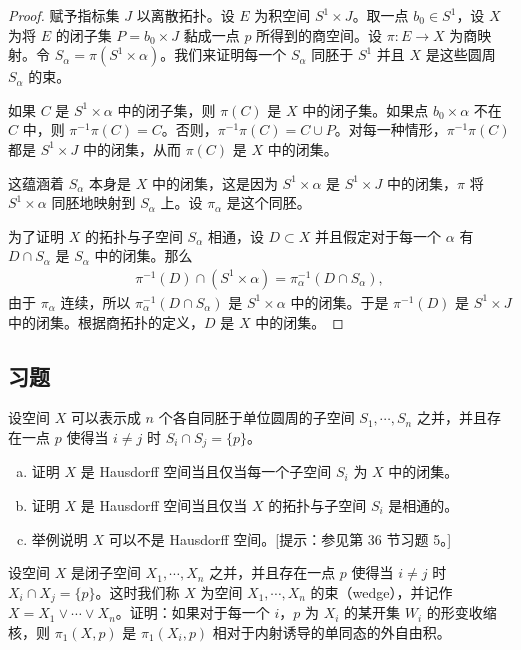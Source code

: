 \documentclass[../../main.tex]{subfiles}
\begin{document}
\begin{proof}
赋予指标集 $J$ 以离散拓扑。设 $E$ 为积空间 $S^1\times J$。取一点 $b_0\in S^1$，设 $X$ 为将 $E$ 的闭子集 $P=b_0\times J$ 黏成一点 $p$ 所得到的商空间。设 $\pi:E\to X$ 为商映射。令 $S_\alpha=\pi(S^1\times\alpha)$。我们来证明每一个 $S_\alpha$ 同胚于 $S^1$ 并且 $X$ 是这些圆周 $S_\alpha$ 的束。

如果 $C$ 是 $S^1\times\alpha$ 中的闭子集，则 $\pi(C)$ 是 $X$ 中的闭子集。如果点 $b_0\times\alpha$ 不在 $C$ 中，则 $\pi^{-1}\pi(C)=C$。否则，$\pi^{-1}\pi(C)=C\cup P$。对每一种情形，$\pi^{-1}\pi(C)$ 都是 $S^1\times J$ 中的闭集，从而 $\pi(C)$ 是 $X$ 中的闭集。

这蕴涵着 $S_\alpha$ 本身是 $X$ 中的闭集，这是因为 $S^1\times\alpha$ 是 $S^1\times J$ 中的闭集，$\pi$ 将 $S^1\times\alpha$ 同胚地映射到 $S_\alpha$ 上。设 $\pi_\alpha$ 是这个同胚。

为了证明 $X$ 的拓扑与子空间 $S_\alpha$ 相通，设 $D\subset X$ 并且假定对于每一个 $\alpha$ 有 $D\cap S_\alpha$ 是 $S_\alpha$ 中的闭集。那么
\begin{align*}
\pi^{-1}(D)\cap(S^1\times\alpha)=\pi_\alpha^{-1}(D\cap S_\alpha),
\end{align*}
由于 $\pi_\alpha$ 连续，所以 $\pi_\alpha^{-1}(D\cap S_\alpha)$ 是 $S^1\times\alpha$ 中的闭集。于是 $\pi^{-1}(D)$ 是 $S^1\times J$ 中的闭集。根据商拓扑的定义，$D$ 是 $X$ 中的闭集。
\end{proof}

\subsection*{习题}

\begin{exercise}\label{exercise:ch11-71-01}
设空间 $X$ 可以表示成 $n$ 个各自同胚于单位圆周的子空间 $S_1,\cdots,S_n$ 之并，并且存在一点 $p$ 使得当 $i\neq j$ 时 $S_i\cap S_j=\{p\}$。
\begin{enumerate}[(a)]
\item 证明 $X$ 是 Hausdorff 空间当且仅当每一个子空间 $S_i$ 为 $X$ 中的闭集。
\item 证明 $X$ 是 Hausdorff 空间当且仅当 $X$ 的拓扑与子空间 $S_i$ 是相通的。
\item 举例说明 $X$ 可以不是 Hausdorff 空间。[提示：参见第 36 节习题 5。]
\end{enumerate}
\end{exercise}

\begin{exercise}\label{exercise:ch11-71-02}
设空间 $X$ 是闭子空间 $X_1,\cdots,X_n$ 之并，并且存在一点 $p$ 使得当 $i\neq j$ 时 $X_i\cap X_j=\{p\}$。这时我们称 $X$ 为空间 $X_1,\cdots,X_n$ 的束（wedge），并记作 $X=X_1\vee\cdots\vee X_n$。证明：如果对于每一个 $i$，$p$ 为 $X_i$ 的某开集 $W_i$ 的形变收缩核，则 $\pi_1(X,p)$ 是 $\pi_1(X_i,p)$ 相对于内射诱导的单同态的外自由积。
\end{exercise}
\end{document}
